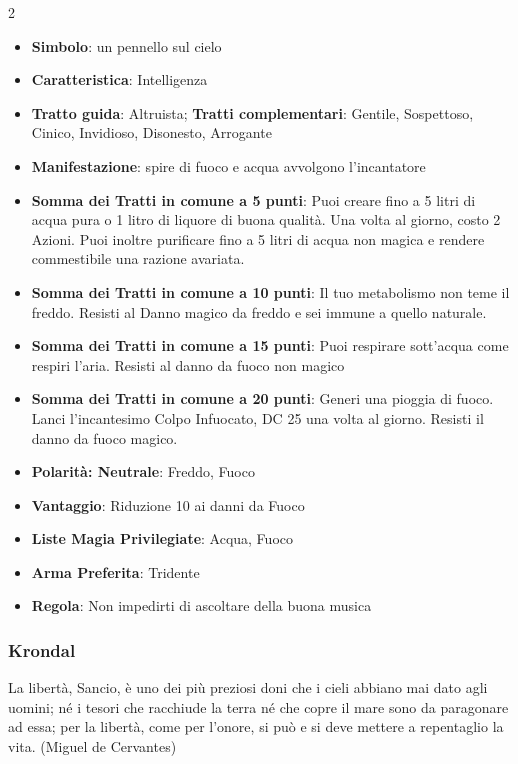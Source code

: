 \begin{multicols}{2}
\begin{itemize}[leftmargin=*] \setlength{\itemsep}{0pt}
\item \textbf{Simbolo}: un pennello sul cielo
\item \textbf{Caratteristica}: Intelligenza
\item \textbf{Tratto guida}: Altruista; \textbf{Tratti complementari}: Gentile, Sospettoso, Cinico, Invidioso, Disonesto, Arrogante
\item \textbf{Manifestazione}: spire di fuoco e acqua avvolgono l'incantatore
\item \textbf{Somma dei Tratti in comune a 5 punti}: Puoi creare fino a 5 litri di acqua pura o 1 litro di liquore di buona qualità. Una volta al giorno, costo 2 Azioni. Puoi inoltre purificare fino a 5 litri di acqua non magica e rendere commestibile una razione avariata.
\item \textbf{Somma dei Tratti in comune a 10 punti}: Il tuo metabolismo non teme il freddo. Resisti al Danno magico da freddo e sei immune a quello naturale.
\item \textbf{Somma dei Tratti in comune a 15 punti}: Puoi respirare sott'acqua come respiri l'aria. Resisti al danno da fuoco non magico
\item \textbf{Somma dei Tratti in comune a 20 punti}: Generi una pioggia di fuoco. Lanci l'incantesimo Colpo Infuocato, DC 25 una volta al giorno. Resisti il danno da fuoco magico.
\item \textbf{Polarità: Neutrale}: Freddo, Fuoco
\item \textbf{Vantaggio}: Riduzione 10 ai danni da Fuoco
\item \textbf{Liste Magia Privilegiate}: Acqua, Fuoco
\item \textbf{Arma Preferita}: Tridente
\item \textbf{Regola}: Non impedirti di ascoltare della buona musica
\end{itemize}

\subsubsection{Krondal}\label{krondal}\hypertarget{krondal}{}

\begin{enfasi}{
La libertà, Sancio, è uno dei più preziosi doni che i cieli abbiano mai dato agli uomini; né i tesori che racchiude la terra né che copre il mare sono da paragonare ad essa; per la libertà, come per l'onore, si può e si deve mettere a repentaglio la vita. (Miguel de Cervantes)
}\end{enfasi}


\end{multicols}
